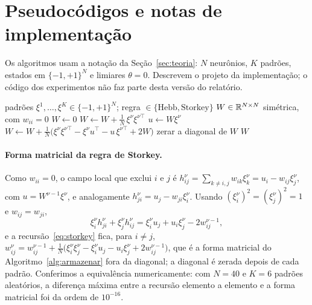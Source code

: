 \section{Pseudocódigos e notas de implementação}\label{apx:algoritmos}

Os algoritmos usam a notação da Seção~\ref{sec:teoria}: $N$ neurônios, $K$ padrões, estados em $\{-1,+1\}^N$ e
limiares $\theta=0$. Descrevem o projeto da implementação; o código dos experimentos não faz parte desta versão
do relatório.

\begin{algorithm}[htbp]
\caption{Armazenamento de $K$ padrões (regra de Hebb ou de Storkey).}\label{alg:armazenar}
\begin{algorithmic}[1]
\Require padrões $\xi^1,\dots,\xi^K\in\{-1,+1\}^N$; regra $\in\{\text{Hebb},\text{Storkey}\}$
\Ensure $W\in\mathbb{R}^{N\times N}$ simétrica, com $w_{ii}=0$
\State $W\gets 0$
    \State $W\gets W+\tfrac1N\,\xi^\nu\xi^{\nu\top}$ 
  \Else
    \State $u\gets W\xi^\nu$
    \State $W\gets W+\tfrac1N\bigl(\xi^\nu\xi^{\nu\top}-\xi^\nu u^{\top}-u\,\xi^{\nu\top}+2W\bigr)$
  \EndIf
  \State zerar a diagonal de $W$
\EndFor
\State \Return $W$
\end{algorithmic}
\end{algorithm}

\paragraph{Forma matricial da regra de Storkey.} Como $w_{ii}=0$, o campo local que exclui $i$ e $j$ é
$h_{ij}^{\nu}=\sum_{k\neq i,j}w_{ik}\xi_k^\nu=u_i-w_{ij}\xi_j^\nu$, com $u=W^{\nu-1}\xi^\nu$, e
analogamente $h_{ji}^{\nu}=u_j-w_{ji}\xi_i^\nu$. Usando $(\xi_i^\nu)^2=(\xi_j^\nu)^2=1$ e $w_{ij}=w_{ji}$,
\[
\xi_i^\nu h_{ji}^\nu+\xi_j^\nu h_{ij}^\nu=\xi_i^\nu u_j+u_i\xi_j^\nu-2w_{ij}^{\nu-1},
\]
e a recursão~\eqref{eq:storkey} fica, para $i\neq j$,
$w_{ij}^{\nu}=w_{ij}^{\nu-1}+\tfrac1N\bigl(\xi_i^\nu\xi_j^\nu-\xi_i^\nu u_j-u_i\xi_j^\nu+2w_{ij}^{\nu-1}\bigr)$,
que é a forma matricial do Algoritmo~\ref{alg:armazenar} fora da diagonal; a diagonal é zerada depois de cada
padrão. Conferimos a equivalência numericamente: com $N=40$ e $K=6$ padrões aleatórios, a diferença máxima entre
a recursão elemento a elemento e a forma matricial foi da ordem de $10^{-16}$.

